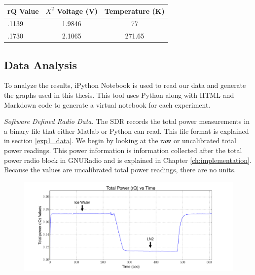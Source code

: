 \begin{table}[h!tb] \centering
{}
\label{exp1_datapoints}
\begin{tabular}{lcc} \hline
\textbf{rQ Value} & \textbf{$X^2$ Voltage (V)} & \textbf{Temperature (K)} \\ \hline
.1139 & 1.9846 & 77 \\
.1730 & 2.1065 & 271.65 \\ \hline
\end{tabular}
\end{table}

\subsection{Data Analysis}\label{Exp1_analysis}

To analyze the results, iPython Notebook is used to read our data and generate the graphs used in this thesis.  This tool uses Python along with HTML and Markdown code to generate a virtual notebook for each experiment.  

\emph{Software Defined Radio Data.}  The SDR records the total power measurements in a binary file that either Matlab or Python can read.  This file format is explained in section \ref{exp1_data}.  We begin by looking at the raw or uncalibrated total power readings.  This power information is information collected after the total power radio block in GNURadio and is explained in Chapter \ref{ch:implementation}.  Because the values are uncalibrated total power readings, there are no units.

\begin{figure}[h!tb] \centering
\includegraphics[width=\textwidth]{Experiments/Exp1/rqvstime_annotate.pdf}
\label{SDR_rQ}
\end{figure}

